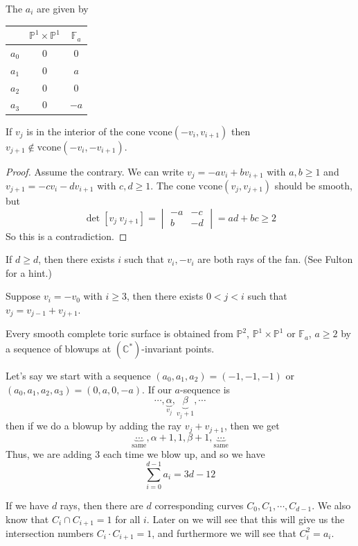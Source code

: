 \documentclass[a4paper,12pt]{amsart}
\newcommand{\CC}{\mathbb{C}}
\newcommand{\PP}{\mathbb{P}}
\begin{document}
The $a_i$ are given by
\begin{center}
	\begin{tabular}{c|c c} 
		& $\PP^1\times\PP^1$&$\mathbb{F}_a$\\
		\hline
		$a_0$ & 0 & 0\\ 
		$a_1$ & 0 & $a$\\ 
		$a_2$ & 0 & 0\\ 
		$a_3$ & 0 & $-a$\\ 
	\end{tabular}
\end{center}

\begin{Lemma}
	If $v_j$ is in the interior of the cone $\text{vcone}(-v_i,v_{i+1})$ then $v_{j+1}\not\in\text{vcone}(-v_i,-v_{i+1})$.
\end{Lemma}
\begin{proof}
	Assume the contrary. We can write $v_j=-av_i+bv_{i+1}$ with $a,b\geq 1$ and $v_{j+1}=-cv_i-dv_{i+1}$ with $c,d\geq 1$. The cone $\text{vcone}(v_j,v_{j+1})$ should be smooth, but
	$$\det[v_j\ v_{j+1}]=\begin{vmatrix}
	-a&-c\\b&-d
	\end{vmatrix}=ad+bc\geq 2$$
	So this is a contradiction.
\end{proof}

\begin{exercise}
	If $d\geq d$, then there exists $i$ such that $v_i,-v_i$ are both rays of the fan. (See Fulton for a hint.)
\end{exercise}

\begin{exercise}
	Suppose $v_i=-v_0$ with $i\geq 3$, then there exists $0<j<i$ such that $v_j=v_{j-1}+v_{j+1}$.
\end{exercise}

\begin{theorem}
	Every smooth complete toric surface is obtained from $\PP^2$, $\PP^1\times\PP^1$ or $\mathbb{F}_a$, $a\geq 2$ by a sequence of blowups at $(\CC^*)$-invariant points.
\end{theorem}

\begin{remark}
	Let's say we start with a sequence $(a_0,a_1,a_2)=(-1,-1,-1)$ or $(a_0,a_1,a_2,a_3)=(0,a,0,-a)$. If our $a$-sequence is
	$$\cdots,\underbrace{\alpha}_{v_j},\underbrace{\beta}_{v_j+1},\cdots$$
	then if we do a blowup by adding the ray $v_j+v_{j+1}$, then we get
	$$\underbrace{\cdots}_\text{same},\alpha+1,1,\beta+1,\underbrace{\cdots}_\text{same}$$
	Thus, we are adding 3 each time we blow up, and so we have
	$$\sum_{i=0}^{d-1}a_i=3d-12$$
\end{remark}

\begin{remark}
	If we have $d$ rays, then there are $d$ corresponding curves $C_0,C_1,\cdots,C_{d-1}$. We also know that $C_i\cap C_{i+1}=1$ for all $i$. Later on we will see that this will give us the intersection numbers $C_i\cdot C_{i+1}=1$, and furthermore we will see that $C_i^2=a_i$.
\end{remark}
\end{document}
